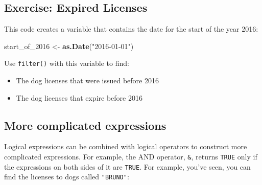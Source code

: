\documentclass[]{Nemilov}
\newenvironment{Shaded}{\begin{snugshade}}{\end{snugshade}}
\newcommand{\DecValTok}[1]{\textcolor[rgb]{0.00,0.00,0.81}{#1}}
\newcommand{\KeywordTok}[1]{\textcolor[rgb]{0.13,0.29,0.53}{\textbf{#1}}}
\newcommand{\NormalTok}[1]{#1}
\newcommand{\OperatorTok}[1]{\textcolor[rgb]{0.81,0.36,0.00}{\textbf{#1}}}
\newcommand{\StringTok}[1]{\textcolor[rgb]{0.31,0.60,0.02}{#1}}
\providecommand{\tightlist}{%
  \setlength{\itemsep}{0pt}\setlength{\parskip}{0pt}}
\begin{document}
\hypertarget{exercise-expired-licenses}{%
\subsection{Exercise: Expired Licenses}\label{exercise-expired-licenses}}

This code creates a variable that contains the date for the start of the year 2016:

\begin{Shaded}
\begin{Highlighting}[]
\NormalTok{start_of_}\DecValTok{2016}\NormalTok{ <-}\StringTok{ }\KeywordTok{as.Date}\NormalTok{(}\StringTok{"2016-01-01"}\NormalTok{)}
\end{Highlighting}
\end{Shaded}

Use \texttt{filter()} with this variable to find:

\begin{itemize}
\tightlist
\item
  The dog licenses that were issued before 2016
\item
  The dog licenses that expire before 2016
\end{itemize}

\hypertarget{more-complicated-expressions}{%
\subsection{More complicated expressions}\label{more-complicated-expressions}}

Logical expressions can be combined with logical operators to construct more complicated expressions. For example, the AND operator, \texttt{\&}, returns \texttt{TRUE} only if the expressions on both sides of it are \texttt{TRUE}. For example, you've seen, you can find the licenses to dogs called \texttt{"BRUNO"}:

\begin{Shaded}
\end{Shaded}
\end{document}
